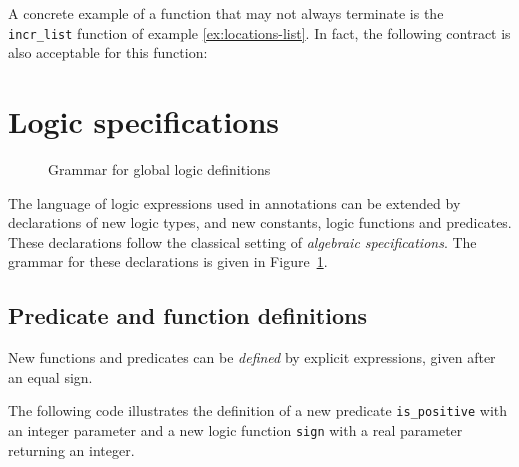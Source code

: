 \begin{example}
  A concrete example of a function that may not always terminate is
  the \lstinline|incr_list| function of example \ref{ex:locations-list}. In
  fact, the following contract is also acceptable for this function:
\end{example}

\section{Logic specifications}
\label{sec:logicspec}
\begin{figure}[t]
  \begin{cadre}
    \vfill\end{cadre}
  \caption{Grammar for global logic definitions}
\label{fig:gram:logic}
\end{figure}
The language of logic expressions used in annotations can be extended
by declarations of new logic types, and new constants, logic functions
and predicates. These declarations follow the classical setting of
\emph{algebraic specifications}.
The grammar for these declarations is given in Figure~\ref{fig:gram:logic}.

\subsection{Predicate and function definitions}
New functions and predicates can be \emph{defined} by explicit
expressions, given after an equal sign.
\begin{example}
  The following code  illustrates the
  definition of a new predicate \lstinline{is_positive} with an integer
  parameter and a new logic function \lstinline{sign} with a real
  parameter returning an integer.
\end{example}



